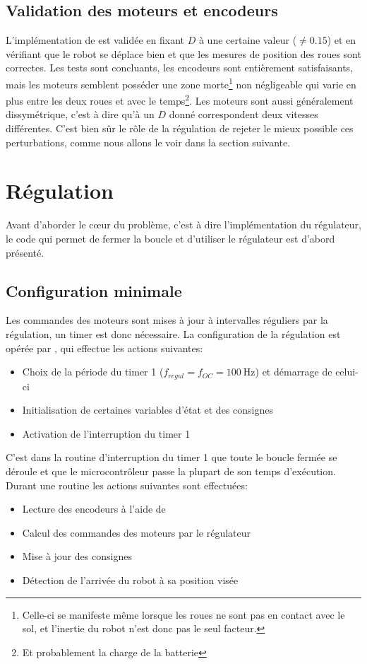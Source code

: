 \subsection{Validation des moteurs et encodeurs\label{sec:validMotor}}
L'implémentation de  est validée en fixant $D$ à une certaine valeur ($\neq 0.15$) et en vérifiant que le robot se déplace bien et que les mesures de position des roues sont correctes. Les tests sont concluants, les encodeurs sont entièrement satisfaisants, mais les moteurs semblent posséder une zone morte\footnote{Celle-ci se manifeste même lorsque les roues ne sont pas en contact avec le sol, et l'inertie du robot n'est donc pas le seul facteur.} non négligeable qui varie en plus entre les deux roues et avec le temps\footnote{Et probablement la charge de la batterie}. Les moteurs sont aussi généralement dissymétrique, c'est à dire qu'à un $D$ donné correspondent deux vitesses différentes. C'est bien sûr le rôle de la régulation de rejeter le mieux possible ces perturbations, comme nous allons le voir dans la section suivante.

\section{Régulation}
Avant d'aborder le c\oe{}ur du problème, c'est à dire l'implémentation du régulateur, le code qui permet de fermer la boucle et d'utiliser le régulateur est d'abord présenté.
\subsection{Configuration minimale}
Les commandes des moteurs sont mises à jour à intervalles réguliers par la régulation, un timer est donc nécessaire. La configuration de la régulation est opérée par , qui effectue les actions suivantes:
\begin{itemize}
  \item Choix de la période du timer 1 ($f_{regul} = f_{OC} = \SI{100}{\hertz}$) et démarrage de celui-ci
  \item Initialisation de certaines variables d'état et des consignes
  \item Activation de l'interruption du timer 1
\end{itemize}

C'est dans la routine d'interruption du timer 1 que toute le boucle fermée se déroule et que le microcontrôleur passe la plupart de son temps d'exécution. Durant une routine les actions suivantes sont effectuées:
\begin{itemize}
  \item Lecture des encodeurs à l'aide de 
  \item Calcul des commandes des moteurs par le régulateur
  \item Mise à jour des consignes
  \item Détection de l'arrivée du robot à sa position visée
\end{itemize}

